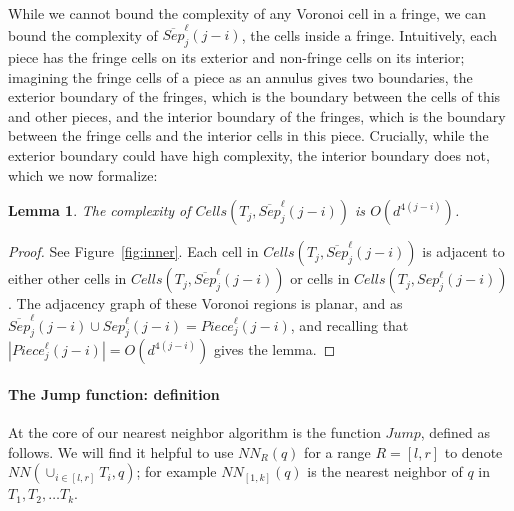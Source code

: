 \documentclass[12pt,a4paper,USenglish,cleveref, autoref, thm-restate]{article}
\newcommand{\Cells}{\mathit{Cells}}
\newcommand{\NN}{\mathit{NN}}
\newcommand{\john}[1]{\textcolor{red}{#1}}
\newcommand{\yakov}[1]{\textcolor{blue}{Yakov: #1}}
\newtheorem{lemma}{Lemma}
\newcommand{\Cells}{\mathit{Cells}}
\newcommand{\NN}{\mathit{NN}}
\newcommand{\john}[1]{\textcolor{red}{#1}}
\newcommand{\yakov}[1]{\textcolor{blue}{Yakov: #1}}
\newcommand{\Cells}{\mathit{Cells}}
\newcommand{\NN}{\mathit{NN}}
\newcommand{\john}[1]{\textcolor{red}{#1}}
\newcommand{\yakov}[1]{\textcolor{blue}{Yakov: #1}}
\begin{document}
While we cannot bound the complexity of any Voronoi cell in a fringe, we can bound the complexity of $\overline{Sep}_j^\ell(j-i)$, the cells inside a fringe.
Intuitively, each piece has the fringe cells on its exterior and non-fringe cells on its interior; imagining the fringe cells of a piece as an annulus gives two boundaries, the exterior boundary of the fringes, which is the boundary between the cells of this and other pieces, and the interior boundary of the fringes, which is the boundary between the fringe cells and the interior cells in this piece. Crucially, while the exterior boundary could have high complexity, the interior boundary does not, which we now formalize:
\begin{lemma}\label{l:inner}
    The complexity of $\Cells(T_j,\overline{Sep}_j^\ell(j-i))$ is $O(d^{4(j-i)})$. 
\end{lemma}
\begin{proof}
See Figure~\ref{fig:inner}.
    Each cell in $\Cells(T_j,\overline{Sep}_j^\ell(j-i))$ is adjacent to either other cells in $\Cells(T_j,\overline{Sep}_j^\ell(j-i))$ or cells in $\Cells(T_j,{Sep}_j^\ell(j-i))$. The adjacency graph of these Voronoi regions is planar, and as $\overline{Sep}_j^\ell(j-i) \cup {Sep}_j^\ell(j-i)= {Piece}_j^\ell(j-i)$, and recalling that $|{Piece}_j^\ell(j-i)|=O(d^{4(j-i)})$ gives the lemma. %
\end{proof}


\paragraph*{The Jump function: definition} 


At the core of our nearest neighbor algorithm is the function $Jump$, defined as follows. 
We will find it helpful to use $\NN_R(q)$ for a range $R=[l,r]$ to denote $\NN(\cup_{i\in [l,r]}T_i,q)$; for example $\NN_{[1,k]}(q)$ is the nearest neighbor of  $q$ in $T_1,T_2,\ldots T_k$. 
\end{document}
